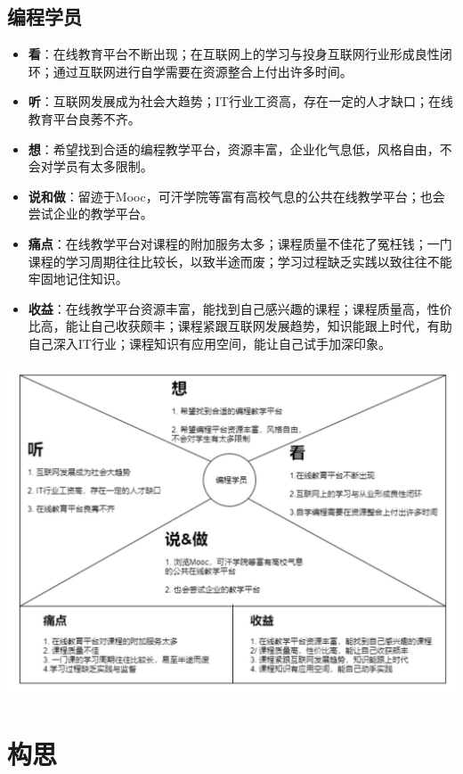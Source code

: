 \documentclass[a4paper]{ctexart}
\begin{document}
\subsection{编程学员}
\begin{itemize}
  \item \textbf{看}：在线教育平台不断出现；在互联网上的学习与投身互联网行业形成良性闭环；通过互联网进行自学需要在资源整合上付出许多时间。
  \item \textbf{听}：互联网发展成为社会大趋势；IT行业工资高，存在一定的人才缺口；在线教育平台良莠不齐。
  \item \textbf{想}：希望找到合适的编程教学平台，资源丰富，企业化气息低，风格自由，不会对学员有太多限制。
  \item \textbf{说和做}：留迹于Mooc，可汗学院等富有高校气息的公共在线教学平台；也会尝试企业的教学平台。
  \item \textbf{痛点}：在线教学平台对课程的附加服务太多；课程质量不佳花了冤枉钱；一门课程的学习周期往往比较长，以致半途而废；学习过程缺乏实践以致往往不能牢固地记住知识。
  \item \textbf{收益}：在线教学平台资源丰富，能找到自己感兴趣的课程；课程质量高，性价比高，能让自己收获颇丰；课程紧跟互联网发展趋势，知识能跟上时代，有助自己深入IT行业；课程知识有应用空间，能让自己试手加深印象。
\end{itemize}

\begin{center}
  \includegraphics[width=14cm]{编程学员.png}
\end{center}

\section{构思}
\end{document}
